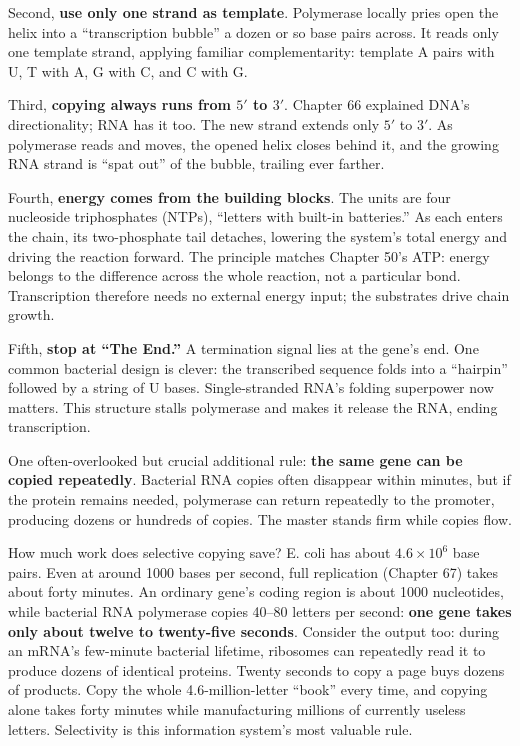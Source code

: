 Second, \textbf{use only one strand as template}. Polymerase locally pries open the helix into a ``transcription bubble'' a dozen or so base pairs across. It reads only one template strand, applying familiar complementarity: template A pairs with U, T with A, G with C, and C with G.

Third, \textbf{copying always runs from $5'$ to $3'$}. Chapter 66 explained DNA's directionality; RNA has it too. The new strand extends only $5'$ to $3'$. As polymerase reads and moves, the opened helix closes behind it, and the growing RNA strand is ``spat out'' of the bubble, trailing ever farther.

Fourth, \textbf{energy comes from the building blocks}. The units are four nucleoside triphosphates (NTPs), ``letters with built-in batteries.'' As each enters the chain, its two-phosphate tail detaches, lowering the system's total energy and driving the reaction forward. The principle matches Chapter 50's ATP: energy belongs to the difference across the whole reaction, not a particular bond. Transcription therefore needs no external energy input; the substrates drive chain growth.

Fifth, \textbf{stop at ``The End.''} A termination signal lies at the gene's end. One common bacterial design is clever: the transcribed sequence folds into a ``hairpin'' followed by a string of U bases. Single-stranded RNA's folding superpower now matters. This structure stalls polymerase and makes it release the RNA, ending transcription.

One often-overlooked but crucial additional rule: \textbf{the same gene can be copied repeatedly}. Bacterial RNA copies often disappear within minutes, but if the protein remains needed, polymerase can return repeatedly to the promoter, producing dozens or hundreds of copies. The master stands firm while copies flow.

\begin{qiaoliang}
How much work does selective copying save? E. coli has about $4.6\times 10^{6}$ base pairs. Even at around 1000 bases per second, full replication (Chapter 67) takes about forty minutes. An ordinary gene's coding region is about 1000 nucleotides, while bacterial RNA polymerase copies 40--80 letters per second: \textbf{one gene takes only about twelve to twenty-five seconds}. Consider the output too: during an mRNA's few-minute bacterial lifetime, ribosomes can repeatedly read it to produce dozens of identical proteins. Twenty seconds to copy a page buys dozens of products. Copy the whole 4.6-million-letter ``book'' every time, and copying alone takes forty minutes while manufacturing millions of currently useless letters. Selectivity is this information system's most valuable rule.
\end{qiaoliang}

